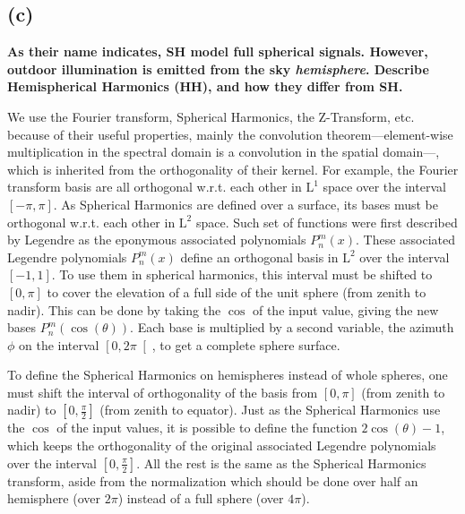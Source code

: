 \documentclass{report}
\begin{document}
\subsection{(c)}
\textbf{As their name indicates, SH model full spherical signals. However, outdoor illumination is emitted from the sky \emph{hemisphere}. Describe Hemispherical Harmonics (HH), and how they differ from SH.}

We use the Fourier transform, Spherical Harmonics, the Z-Transform, etc. because of their useful properties, mainly the convolution theorem---element-wise multiplication in the spectral domain is a convolution in the spatial domain---, which is inherited from the orthogonality of their kernel. For example, the Fourier transform basis are all orthogonal w.r.t. each other in $\mathrm{L}^1$ space over the interval $\left[-\pi, \pi\right]$. As Spherical Harmonics are defined over a surface, its bases must be orthogonal w.r.t. each other in $\mathrm{L}^2$ space. Such set of functions were first described by Legendre as the eponymous associated polynomials $P_n^m(x)$. These associated Legendre polynomials $P_n^m(x)$ define an orthogonal basis in $\mathrm{L}^2$ over the interval $\left[ -1, 1 \right]$. To use them in spherical harmonics, this interval must be shifted to $\left[ 0, \pi \right]$ to cover the elevation of a full side of the unit sphere (from zenith to nadir). This can be done by taking the $\cos$ of the input value, giving the new bases $P_n^m\left(\cos(\theta)\right)$. Each base is multiplied by a second variable, the azimuth $\phi$ on the interval $\left[ 0, 2\pi \right[$, to get a complete sphere surface.

To define the Spherical Harmonics on hemispheres instead of whole spheres, one must shift the interval of orthogonality of the basis from $\left[ 0, \pi \right]$ (from zenith to nadir) to $\left[ 0, \frac{\pi}{2} \right]$ (from zenith to equator). Just as the Spherical Harmonics use the $\cos$ of the input values, it is possible to define the function $2\cos(\theta)-1$, which keeps the orthogonality of the original associated Legendre polynomials over the interval $\left[ 0, \frac{\pi}{2} \right]$. All the rest is the same as the Spherical Harmonics transform, aside from the normalization which should be done over half an hemisphere (over $2\pi$) instead of a full sphere (over $4\pi$).
\end{document}
